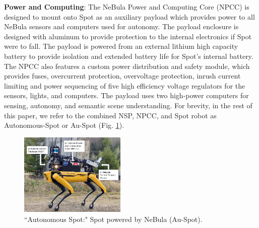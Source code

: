 \documentclass[letterpaper, 10pt, conference]{ieeeconf}      %
\newcommand{\ph}[1]{{\textbf{#1}:}} %
\begin{document}


\ph{Power and Computing}
The NeBula Power and Computing Core (NPCC) is designed to mount onto Spot as an auxiliary payload which provides power to all NeBula sensors and computers used for autonomy. The payload enclosure is designed with aluminum to provide protection to the internal electronics if Spot were to fall. 
The payload is powered from an external lithium high capacity battery to provide isolation and extended battery life for Spot's internal battery. 
The NPCC also features a custom power distribution and safety module, which provides fuses, overcurrent protection, overvoltage protection, inrush current limiting and power sequencing of five high efficiency voltage regulators for the sensors, lights, and computers. %
The payload uses two high-power computers 
for sensing, autonomy, and semantic scene understanding.
For brevity, in the rest of this paper, we refer to the combined NSP, NPCC, and Spot robot as Autonomous-Spot or Au-Spot (Fig. \ref{fig:spot_full_nebula_form}).

\begin{figure}[t]
  \centering
  \includegraphics[width=0.45\textwidth]{graphics/spot_full_annotated_1.PNG}
  \caption{``Autonomous Spot:" Spot powered by NeBula (Au-Spot).}
  \label{fig:spot_full_nebula_form}
\end{figure}

    
\end{document}
